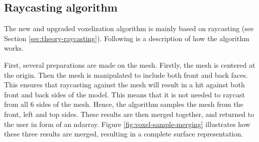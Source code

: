 \subsection{Raycasting algorithm}
\label{sec:method-raycasting-algorithm}
The new and upgraded voxelization algorithm is mainly based on raycasting (see Section \ref{sec:theory-raycasting}). Following is a description of how the algorithm works.

First, several preparations are made on the mesh. Firstly, the mesh is centered at the origin. Then the mesh is manipulated to include both front and back faces. This ensures that raycasting against the mesh will result in a hit against both front and back sides of the model. This means that it is not needed to raycast from all 6 sides of the mesh. Hence, the algorithm samples the mesh from the front, left and top sides. These results are then merged together, and returned to the user in form of an ndarray. Figure \ref{fig:voxel-sample-merging} illustrates how these three results are merged, resulting in a complete surface representation.

